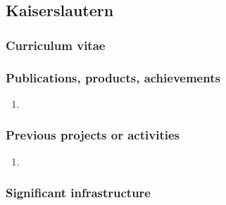 \subsection*{Kaiserslautern}


\subsubsection*{Curriculum vitae}



\subsubsection*{Publications, products, achievements}

\begin{enumerate}
\item {}
\end{enumerate}

\subsubsection*{Previous projects or activities}

\begin{enumerate}
\item {}
\end{enumerate}

\subsubsection*{Significant infrastructure}

